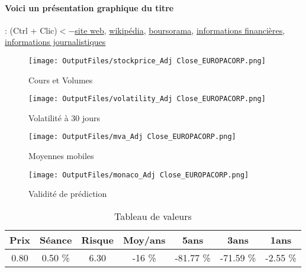 \documentclass[11pt,a4paper]{report}%
\begin{document}
\paragraph{Voici un présentation graphique du titre} : (Ctrl + Clic)$<-$\href{http://www.europacorp.com/fr/espace-investisseurs/}{site web}, \href{https://fr.wikipedia.org/wiki/EuropaCorp}{wikipédia}, \href{https://www.boursorama.com/cours/1rPECP}{boursorama}, \href{https://www.qwant.com/?q=site:https:%2f%2fwww.easybourse.com%2faction-societe%2fEUROPACORP&t=web&client=ext-firefox-hp}{informations financières}, \href{https://bourse.lerevenu.com/cours-de-bourse/fiche-valeur-synthese/EUROPACORP/ECP-FR}{informations journalistiques}
\begin{figure}[!htb]
   \begin{minipage}{0.5\textwidth}
     \centering
     \texttt{[image: OutputFiles/stockprice\_Adj Close\_EUROPACORP.png]}
     \caption{Cours et Volumes}\label{Fig:price_EUROPACORP}
   \end{minipage}\hfill
   \begin{minipage}{0.5\textwidth}
     \centering
     \texttt{[image: OutputFiles/volatility\_Adj Close\_EUROPACORP.png]}
     \caption{Volatilité à 30 jours}\label{Fig:volat_EUROPACORP}
   \end{minipage}
\end{figure}
\begin{figure}[!htb]
   \begin{minipage}{0.5\textwidth}
     \centering
     \texttt{[image: OutputFiles/mva\_Adj Close\_EUROPACORP.png]}
     \caption{Moyennes mobiles}\label{Fig:mva_EUROPACORP}
   \end{minipage}\hfill
   \begin{minipage}{0.5\textwidth}
     \centering
     \texttt{[image: OutputFiles/monaco\_Adj Close\_EUROPACORP.png]}
     \caption{Validité de prédiction}\label{Fig:prediction_EUROPACORP}
   \end{minipage}
\end{figure}

\begin{table}[H]
  \centering
    \begin{tabular}{|c|c|c|c|c|c|c|}
    \hline
    Prix & Séance & Risque  & Moy/ans & 5ans & 3ans & 1ans \\
    \hline
    0.80 &    0.50 \%    & 6.30 & -16 \% & -81.77 \% & -71.59 \% & -2.55 \% \\
    \hline
    \end{tabular}%
        \label{tab:table_EUROPACORP}%
      \caption{Tableau de valeurs}
\end{table}%
\end{document}
